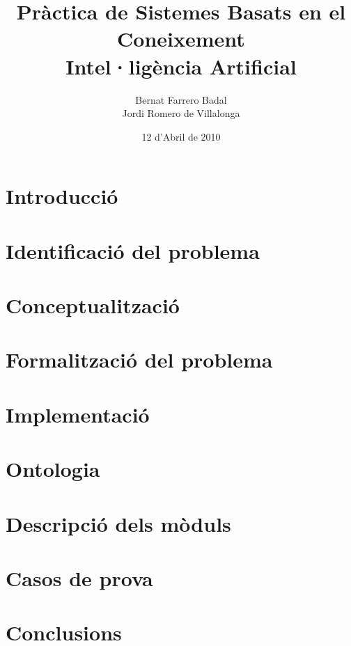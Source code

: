 \documentclass[a4paper]{report}
\author{Bernat Farrero Badal \\Jordi Romero de Villalonga}
\title{Pràctica de Sistemes Basats en el Coneixement \\ Intel·ligència Artificial}
\date{12 d'Abril de 2010}
\begin{document}
\maketitle

\tableofcontents

\newpage

\chapter{Introducció}


\chapter{Identificació del problema}


\chapter{Conceptualització}


\chapter{Formalització del problema}


\chapter{Implementació}


\chapter{Ontologia}


\chapter{Descripció dels mòduls}


\chapter{Casos de prova}


\chapter{Conclusions}

\end{document}
